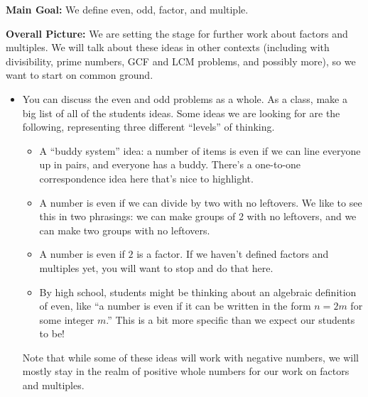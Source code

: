 \documentclass{ximera}
\begin{document}
\newpage
\begin{instructorNotes}

{\bf Main Goal:} We define even, odd, factor, and multiple.


{\bf Overall Picture:} We are setting the stage for further work about factors and multiples. We will talk about these ideas in other contexts (including with divisibility, prime numbers, GCF and LCM problems, and possibly more), so we want to start on common ground.

\begin{itemize}
\item You can discuss the even and odd problems as a whole. As a class, make a big list of all of the students ideas. Some ideas we are looking for are the following, representing three different ``levels'' of thinking.

\begin{itemize}
	\item A ``buddy system'' idea: a number of items is even if we can line everyone up in pairs, and everyone has a buddy. There's a one-to-one correspondence idea here that's nice to highlight.
	\item A number is even if we can divide by two with no leftovers. We like to see this in two phrasings: we can make groups of 2 with no leftovers, and we can make two groups with no leftovers.
	\item A number is even if $2$ is a factor. If we haven't defined factors and multiples yet, you will want to stop and do that here.
	\item By high school, students might be thinking about an algebraic definition of even, like ``a number is even if it can be written in the form $n = 2m$ for some integer $m$.'' This is a bit more specific than we expect our students to be!
\end{itemize}
Note that while some of these ideas will work with negative numbers, we will mostly stay in the realm of positive whole numbers for our work on factors and multiples.


\end{itemize}
\end{instructorNotes}
\end{document}
